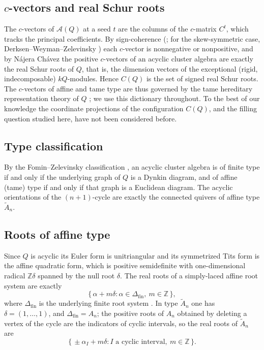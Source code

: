 \documentclass[11pt, a4paper]{amsart}
\theoremstyle{definition}
\newcommand{\ZZ}{\mathbb{Z}}
\newcommand{\cA}{\mathcal{A}}
\begin{document}
\subsection*{\texorpdfstring{$c$-vectors}{c-vectors} and real Schur roots}
The $c$-vectors of $\cA(Q)$ at a seed $t$ are the columns of the $c$-matrix
$C^t$, which tracks the principal coefficients. By sign-coherence
\textup{(}\cite[Corollary~5.5]{GHKK2018}; for the skew-symmetric case,
Derksen--Weyman--Zelevinsky \cite{DWZ2010}\textup{)} each $c$-vector is
nonnegative or nonpositive, and by N\'ajera Ch\'avez
\cite[Theorem~1.3]{NajeraChavez2013} the positive $c$-vectors of an acyclic
cluster algebra are exactly the real Schur roots of $Q$, that is, the
dimension vectors of the exceptional (rigid, indecomposable) $kQ$-modules.
Hence $C(Q)$ is the set of signed real Schur roots. The $c$-vectors of affine
and tame type are thus governed by the tame hereditary representation theory
of $Q$ \cite{Ringel1984}; we use this dictionary throughout. To the best of
our knowledge the coordinate projections of the configuration $C(Q)$, and the
filling question studied here, have not been considered before.

\subsection*{Type classification}
By the Fomin--Zelevinsky classification \cite{FominZelevinsky2003II}, an
acyclic cluster algebra is of finite type if and only if the underlying
graph of $Q$ is a Dynkin diagram, and of affine (tame) type if and only
if that graph is a Euclidean diagram. The acyclic orientations of the
$(n+1)$-cycle are exactly the connected quivers of affine type
$\widetilde{A}_n$.

\subsection*{Roots of affine type}
Since $Q$ is acyclic its Euler form is unitriangular and its symmetrized
Tits form is the affine quadratic form, which is positive semidefinite
with one-dimensional radical $\ZZ\delta$ spanned by the null root
$\delta$. The real roots of a simply-laced affine root system are exactly
\[
  \{\, \alpha + m\delta : \alpha \in \Delta_{\mathrm{fin}},\ m \in \ZZ \,\},
\]
where $\Delta_{\mathrm{fin}}$ is the underlying finite root system
\cite[Ch.~6]{Kac1990}. In type $\widetilde{A}_n$ one has
$\delta = (1, \dots, 1)$, and $\Delta_{\mathrm{fin}} = A_n$; the positive
roots of $A_n$ obtained by deleting a vertex of the cycle are the
indicators of cyclic intervals, so the real roots of $\widetilde{A}_n$
are
\[
  \{\, \pm \alpha_I + m\delta : I \text{ a cyclic interval},\ m \in \ZZ \,\}.
\]
\end{document}
